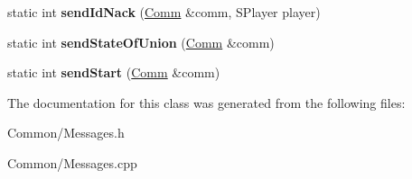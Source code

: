 \begin{DoxyCompactItemize}
\item 
\hypertarget{classbali_1_1_messages_a5bb2bef578d3a5a68c8ce98fc7385e46}{static int {\bfseries send\-Id\-Nack} (\hyperlink{classbali_1_1_comm}{Comm} \&comm, S\-Player player)}\label{classbali_1_1_messages_a5bb2bef578d3a5a68c8ce98fc7385e46}

\item 
\hypertarget{classbali_1_1_messages_a8e2b6032c2e2013aa919774c1c478667}{static int {\bfseries send\-State\-Of\-Union} (\hyperlink{classbali_1_1_comm}{Comm} \&comm)}\label{classbali_1_1_messages_a8e2b6032c2e2013aa919774c1c478667}

\item 
\hypertarget{classbali_1_1_messages_a469d25574d22848086bf5f08b23b1610}{static int {\bfseries send\-Start} (\hyperlink{classbali_1_1_comm}{Comm} \&comm)}\label{classbali_1_1_messages_a469d25574d22848086bf5f08b23b1610}

\end{DoxyCompactItemize}


The documentation for this class was generated from the following files\-:\begin{DoxyCompactItemize}
\item 
Common/Messages.\-h\item 
Common/Messages.\-cpp\end{DoxyCompactItemize}
